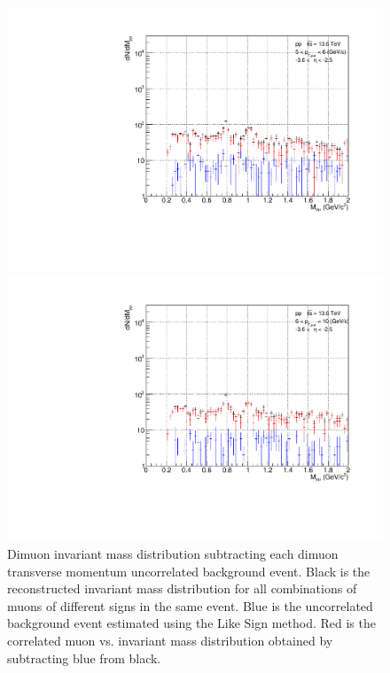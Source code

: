 \begin{figure}[H]
                    \\
                    \vspace{1em}
                    \begin{minipage}{0.45\textwidth}
                        \centering
                        \includegraphics[width=\textwidth]{fig/3_4_1_CB_pt_5to6.pdf}
                        \caption*{$5 < p_{T\mu\mu} < 6 (\mathrm{GeV/c})$}
                    \end{minipage}
                    \hfill
                    \begin{minipage}{0.45\textwidth}
                        \centering
                        \includegraphics[width=\textwidth]{fig/3_4_1_CB_pt_6to10.pdf}
                        \caption*{$6 < p_{T\mu\mu} < 10 (\mathrm{GeV/c})$}
                    \end{minipage}
                    \caption{Dimuon invariant mass distribution subtracting each dimuon transverse momentum uncorrelated background event. Black is the reconstructed invariant mass distribution for all combinations of muons of different signs in the same event. Blue is the uncorrelated background event estimated using the Like Sign method. Red is the correlated muon vs. invariant mass distribution obtained by subtracting blue from black.}
                    \label{Analysis:Dimuon:CB:CB_pt_separation}
                \end{figure}
